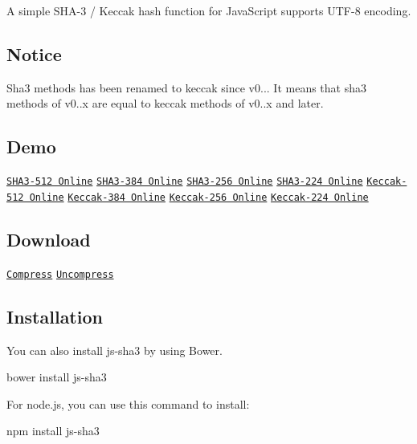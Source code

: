 \href{https://travis-ci.org/emn178/js-sha3}{\tt } \href{https://coveralls.io/r/emn178/js-sha3?branch=master}{\tt } \href{https://nodei.co/npm/js-sha3/}{\tt } A simple S\+H\+A-\/3 / Keccak hash function for Java\+Script supports U\+T\+F-\/8 encoding.

\subsection*{Notice}

Sha3 methods has been renamed to keccak since v0... It means that sha3 methods of v0..\+x are equal to keccak methods of v0..\+x and later.

\subsection*{Demo}

\href{http://emn178.github.io/online-tools/sha3_512.html}{\tt S\+H\+A3-\/512 Online} \href{http://emn178.github.io/online-tools/sha3_384.html}{\tt S\+H\+A3-\/384 Online} \href{http://emn178.github.io/online-tools/sha3_256.html}{\tt S\+H\+A3-\/256 Online} \href{http://emn178.github.io/online-tools/sha3_224.html}{\tt S\+H\+A3-\/224 Online} \href{http://emn178.github.io/online-tools/keccak_512.html}{\tt Keccak-\/512 Online} \href{http://emn178.github.io/online-tools/keccak_384.html}{\tt Keccak-\/384 Online} \href{http://emn178.github.io/online-tools/keccak_256.html}{\tt Keccak-\/256 Online} \href{http://emn178.github.io/online-tools/keccak_224.html}{\tt Keccak-\/224 Online}

\subsection*{Download}

\href{https://raw.github.com/emn178/js-sha3/master/build/sha3.min.js}{\tt Compress} \href{https://raw.github.com/emn178/js-sha3/master/src/sha3.js}{\tt Uncompress}

\subsection*{Installation}

You can also install js-\/sha3 by using Bower. \begin{DoxyVerb}bower install js-sha3
\end{DoxyVerb}


For node.\+js, you can use this command to install\+: \begin{DoxyVerb}npm install js-sha3
\end{DoxyVerb}


